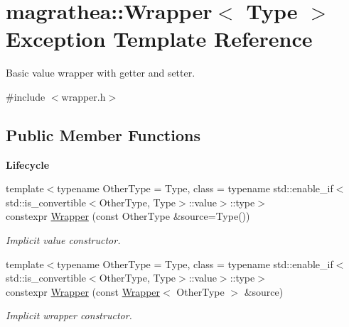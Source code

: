 \hypertarget{exceptionmagrathea_1_1Wrapper}{\section{magrathea\-:\-:Wrapper$<$ Type $>$ Exception Template Reference}
\label{exceptionmagrathea_1_1Wrapper}
}


Basic value wrapper with getter and setter.  




{\ttfamily \#include $<$wrapper.\-h$>$}

\subsection*{Public Member Functions}
\begin{Indent}{\bf Lifecycle}\par
\begin{DoxyCompactItemize}
\item 
{\footnotesize template$<$typename Other\-Type  = Type, class  = typename std\-::enable\-\_\-if$<$std\-::is\-\_\-convertible$<$\-Other\-Type, Type$>$\-::value$>$\-::type$>$ }\\constexpr \hyperlink{exceptionmagrathea_1_1Wrapper_af967634af753a96279c9478383b9385c}{Wrapper} (const Other\-Type \&source=Type())
\begin{DoxyCompactList}\small\item\em Implicit value constructor. \end{DoxyCompactList}\item 
{\footnotesize template$<$typename Other\-Type  = Type, class  = typename std\-::enable\-\_\-if$<$std\-::is\-\_\-convertible$<$\-Other\-Type, Type$>$\-::value$>$\-::type$>$ }\\constexpr \hyperlink{exceptionmagrathea_1_1Wrapper_a1f1fca16abb98fa290da4b5e77ab4b67}{Wrapper} (const \hyperlink{exceptionmagrathea_1_1Wrapper}{Wrapper}$<$ Other\-Type $>$ \&source)
\begin{DoxyCompactList}\small\item\em Implicit wrapper constructor. \end{DoxyCompactList}\end{DoxyCompactItemize}
\end{Indent}
